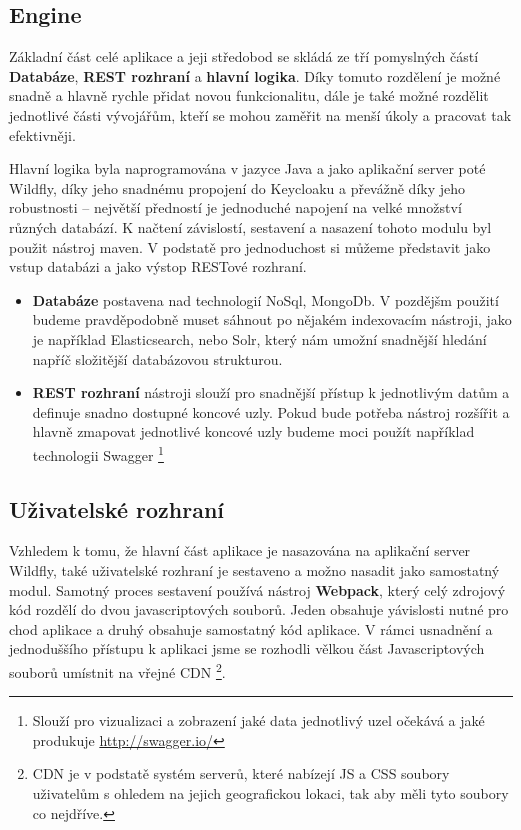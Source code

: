 \subsection{Engine}
\par Základní část celé aplikace a jeji středobod se skládá ze tří pomyslných částí \textbf{Databáze}, \textbf{REST rozhraní} a \textbf{hlavní logika}. Díky tomuto rozdělení je možné snadně a hlavně rychle přidat novou funkcionalitu, dále je také možné rozdělit jednotlivé části vývojářům, kteří se mohou zaměřit na menší úkoly a pracovat tak efektivněji.

\par Hlavní logika byla naprogramována v jazyce Java a jako aplikační server poté Wildfly, díky jeho snadnému propojení do Keycloaku a převážně díky jeho robustnosti -- největší předností je jednoduché napojení na velké množství různých databází. K načtení závislostí, sestavení a nasazení tohoto modulu byl použit nástroj maven. V podstatě pro jednoduchost si můžeme představit jako vstup databázi a jako výstop RESTové rozhraní.

\begin{itemize}
  \item \textbf{Databáze} postavena nad technologií NoSql, MongoDb. V pozdějšm použití budeme pravděpodobně muset sáhnout po nějakém indexovacím nástroji, jako je například Elasticsearch, nebo Solr, který nám umožní snadnější hledání napříč složitější databázovou strukturou.
  \item \textbf{REST rozhraní} nástroji slouží pro snadnější přístup k jednotlivým datům a definuje snadno dostupné koncové uzly. Pokud bude potřeba nástroj rozšířit a hlavně zmapovat jednotlivé koncové uzly budeme moci použít například technologii Swagger \footnote{Slouží pro vizualizaci a zobrazení jaké data jednotlivý uzel očekává a jaké produkuje \url{http://swagger.io/}}
\end{itemize}

\subsection{Uživatelské rozhraní}
\par Vzhledem k tomu, že hlavní část aplikace je nasazována na aplikační server Wildfly, také uživatelské rozhraní je sestaveno a možno nasadit jako samostatný modul. Samotný proces sestavení používá nástroj \textbf{Webpack}, který celý zdrojový kód rozdělí do dvou javascriptových souborů. Jeden obsahuje yávislosti nutné pro chod aplikace a druhý obsahuje samostatný kód aplikace. V rámci usnadnění a jednoduššího přístupu k aplikaci jsme se rozhodli vělkou část Javascriptových souborů umístnit na vřejné CDN \footnote{CDN je v podstatě systém serverů, které nabízejí JS a CSS soubory uživatelům s ohledem na jejich geografickou lokaci, tak aby měli tyto soubory co nejdříve.}.

